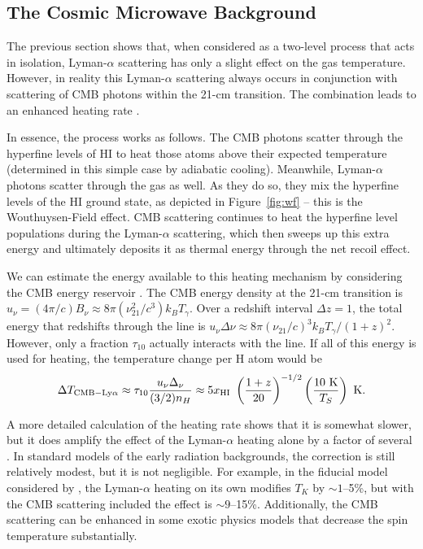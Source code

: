 \documentclass[a4paper,openany, 12pt]{book}
\begin{document}
\subsection{The Cosmic Microwave Background} 

The previous section shows that, when considered as a two-level process that acts in isolation, Lyman-$\alpha$ scattering has only a slight effect on the gas temperature. However, in reality this Lyman-$\alpha$ scattering always occurs in conjunction with scattering of CMB photons within the 21-cm transition. The combination leads to an enhanced heating rate \cite{venumadhav18}.

In essence, the process works as follows. The CMB photons scatter through the hyperfine levels of HI to heat those atoms above their expected temperature (determined in this simple case by adiabatic cooling). Meanwhile, Lyman-$\alpha$ photons scatter through the gas as well. As they do so, they mix the hyperfine levels of the HI ground state, as depicted in Figure~\ref{fig:wf} -- this is the Wouthuysen-Field effect. CMB scattering continues to heat the hyperfine level populations during the Lyman-$\alpha$ scattering, which then sweeps up this extra energy and ultimately deposits it as thermal energy through the net recoil effect.

We can estimate the energy available to this heating mechanism by considering the CMB energy reservoir \cite{venumadhav18}. The CMB energy density at the 21-cm transition is $u_\nu = (4 \pi/c) B_\nu \approx 8 \pi (\nu_{21}^2/c^3) k_B T_\gamma$. Over a redshift interval $\Delta z=1$, the total energy that redshifts through the line is $u_\nu \Delta \nu \approx 8 \pi (\nu_{21}/c)^3 k_B T_\gamma / (1+z)^2$. However, only a fraction $\tau_{10}$ actually interacts with the line. If all of this energy is used for heating, the temperature change per H atom would be
\begin{equation}
\Delta T_{\rm CMB-Ly\alpha} \approx \tau_{10} {u_\nu \Delta_\nu \over (3/2) n_H} \approx 5 x_{\rm HI} \  \left( {1 + z \over 20} \right)^{-1/2} \left( {10 \ {\rm K} \over T_S} \right) \ {\rm K}.
\label{eq:cmb-lya-heat}
\end{equation}

A more detailed calculation of the heating rate shows that it is somewhat slower, but it does amplify the effect of the Lyman-$\alpha$ heating alone by a factor of several \cite{venumadhav18}. In standard models of the early radiation backgrounds, the correction is still relatively modest, but it is not negligible. For example, in the fiducial model considered by \cite{venumadhav18}, the Lyman-$\alpha$ heating on its own modifies $T_K$ by $\sim 1$--5\%, but with the CMB scattering included the effect is $\sim 9$--15\%. Additionally, the CMB scattering can be enhanced in some exotic physics models that decrease the spin temperature substantially.
\end{document}
